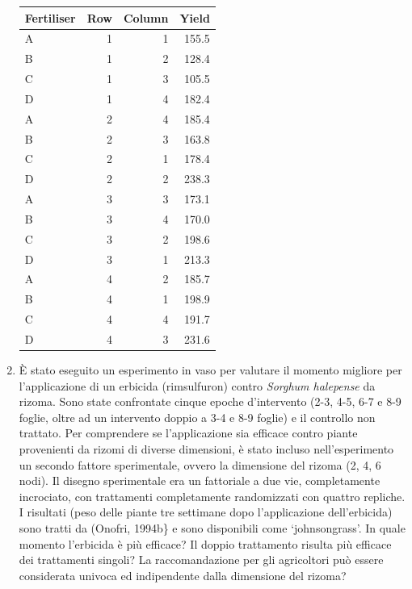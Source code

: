 \documentclass[
  12pt,
]{book}
\begin{document}
\begin{enumerate}
  \begin{longtable}[]{@{}lrrr@{}}
  \toprule()
  Fertiliser & Row & Column & Yield \\
  \midrule()
  \endhead
  A & 1 & 1 & 155.5 \\
  B & 1 & 2 & 128.4 \\
  C & 1 & 3 & 105.5 \\
  D & 1 & 4 & 182.4 \\
  A & 2 & 4 & 185.4 \\
  B & 2 & 3 & 163.8 \\
  C & 2 & 1 & 178.4 \\
  D & 2 & 2 & 238.3 \\
  A & 3 & 3 & 173.1 \\
  B & 3 & 4 & 170.0 \\
  C & 3 & 2 & 198.6 \\
  D & 3 & 1 & 213.3 \\
  A & 4 & 2 & 185.7 \\
  B & 4 & 1 & 198.9 \\
  C & 4 & 4 & 191.7 \\
  D & 4 & 3 & 231.6 \\
  \bottomrule()
  \end{longtable}
\item
  È stato eseguito un esperimento in vaso per valutare il momento migliore per l'applicazione di un erbicida (rimsulfuron) contro \emph{Sorghum halepense} da rizoma. Sono state confrontate cinque epoche d'intervento (2-3, 4-5, 6-7 e 8-9 foglie, oltre ad un intervento doppio a 3-4 e 8-9 foglie) e il controllo non trattato. Per comprendere se l'applicazione sia efficace contro piante provenienti da rizomi di diverse dimensioni, è stato incluso nell'esperimento un secondo fattore sperimentale, ovvero la dimensione del rizoma (2, 4, 6 nodi). Il disegno sperimentale era un fattoriale a due vie, completamente incrociato, con trattamenti completamente randomizzati con quattro repliche. I risultati (peso delle piante tre settimane dopo l'applicazione dell'erbicida) sono tratti da (Onofri, 1994b\} e sono disponibili come `johnsongrass'. In quale momento l'erbicida è più efficace? Il doppio trattamento risulta più efficace dei trattamenti singoli? La raccomandazione per gli agricoltori può essere considerata univoca ed indipendente dalla dimensione del rizoma?
\end{enumerate}
\end{document}
